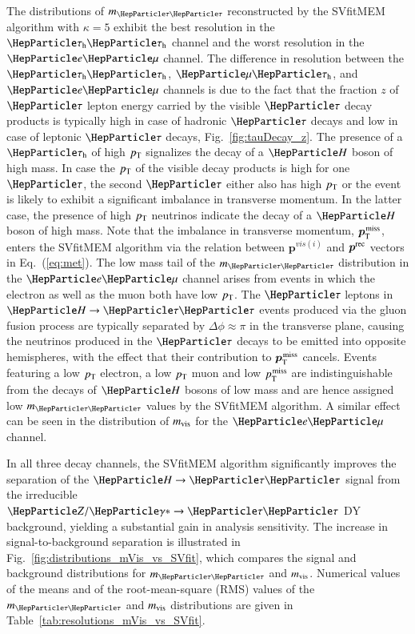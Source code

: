 The distributions of $m_{\Pgt\Pgt}$ reconstructed by the
SVfitMEM algorithm with $\kappa = 5$ exhibit the best
resolution in the $\tauh\tauh$ channel and the worst resolution in the $\Pe\Pgm$ channel.
The difference in resolution between the $\tauh\tauh$, $\Pgm\tauh$,
and $\Pe\Pgm$ channels
is due to the fact that the fraction $z$ of
$\Pgt$ lepton energy carried by the visible $\Pgt$ decay
products is typically high in case of hadronic $\Pgt$ decays
and low in case of leptonic $\Pgt$ decays, \cf Fig.~\ref{fig:tauDecay_z}.
The presence of a $\tauh$ of high $p_{\textrm{T}}$ signalizes the decay of a
$\PHiggs$ boson of high mass.
In case the $p_{\textrm{T}}$ of the visible decay products is high
for one $\Pgt$, the second $\Pgt$ either also has high $p_{\textrm{T}}$ or the
event is likely to exhibit a significant
imbalance in transverse momentum.
In the latter case, the presence of high $p_{\textrm{T}}$ neutrinos indicate the decay of a $\PHiggs$ boson of high mass.
Note that the imbalance in transverse momentum, $\bm{p}_{\textrm{T}}^{\textrm{\kern0.10em miss}}$, enters the
SVfitMEM algorithm via the relation between 
$\bm{p}^{vis(i)}$ and $\bm{p}^{\textrm{rec}}$ vectors in Eq.~(\ref{eq:met}).
The low mass tail of the $m_{\Pgt\Pgt}$ distribution in the $\Pe\Pgm$
channel arises from events in which the electron as well as the muon
both have low $p_{\textrm{T}}$.
The $\Pgt$ leptons in $\PHiggs \to \Pgt\Pgt$ events produced via the
gluon fusion process are typically separated by $\Delta\phi \approx
\pi$ in the transverse plane,
causing the neutrinos produced in the $\Pgt$ decays to be emitted into
opposite hemispheres, with the effect that their contribution to $\bm{p}_{\textrm{T}}^{\textrm{\kern0.10em miss}}$ cancels.
Events featuring a low $p_{\textrm{T}}$ electron, a low $p_{\textrm{T}}$ muon and low $p_{\textrm{T}}^{\textrm{\kern0.10em miss}}$
are indistinguishable from the decays of $\PHiggs$ bosons of low mass
and are hence assigned low $m_{\Pgt\Pgt}$ values by the SVfitMEM algorithm.
A similar effect can be seen in the distribution of $m_{\textrm{vis}}$ 
for the $\Pe\Pgm$ channel.

In all three decay channels, the SVfitMEM algorithm significantly improves the separation of the $\PHiggs \to \Pgt\Pgt$ signal 
from the irreducible $\PZ/\Pggx \to \Pgt\Pgt$ DY background, yielding a substantial gain in analysis sensitivity.
The increase in signal-to-background separation is illustrated in
Fig.~\ref{fig:distributions_mVis_vs_SVfit},
which compares the signal and background distributions for $m_{\Pgt\Pgt}$ and $m_{\textrm{vis}}$.
Numerical values of the means and of the root-mean-square (RMS) values
of the $m_{\Pgt\Pgt}$ and $m_{\textrm{vis}}$ distributions are given in
Table~\ref{tab:resolutions_mVis_vs_SVfit}.

